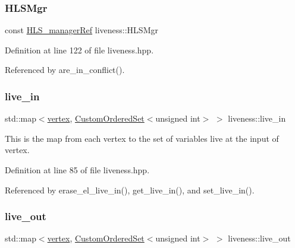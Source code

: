 \subsubsection{\texorpdfstring{H\+L\+S\+Mgr}{HLSMgr}}
{\footnotesize\ttfamily const \hyperlink{hls__manager_8hpp_acd3842b8589fe52c08fc0b2fcc813bfe}{H\+L\+S\+\_\+manager\+Ref} liveness\+::\+H\+L\+S\+Mgr\hspace{0.3cm}{\ttfamily [private]}}



Definition at line 122 of file liveness.\+hpp.



Referenced by are\+\_\+in\+\_\+conflict().

\mbox{\label{classliveness_a75ba4b82410bc9747fcdb44f6b313f00}} 
\subsubsection{\texorpdfstring{live\+\_\+in}{live\_in}}
{\footnotesize\ttfamily std\+::map$<$\hyperlink{graph_8hpp_abefdcf0544e601805af44eca032cca14}{vertex}, \hyperlink{classCustomOrderedSet}{Custom\+Ordered\+Set}$<$unsigned int$>$ $>$ liveness\+::live\+\_\+in\hspace{0.3cm}{\ttfamily [private]}}



This is the map from each vertex to the set of variables live at the input of vertex. 



Definition at line 85 of file liveness.\+hpp.



Referenced by erase\+\_\+el\+\_\+live\+\_\+in(), get\+\_\+live\+\_\+in(), and set\+\_\+live\+\_\+in().

\mbox{\label{classliveness_adbc38597d5850581947517fbf25d6354}} 
\subsubsection{\texorpdfstring{live\+\_\+out}{live\_out}}
{\footnotesize\ttfamily std\+::map$<$\hyperlink{graph_8hpp_abefdcf0544e601805af44eca032cca14}{vertex}, \hyperlink{classCustomOrderedSet}{Custom\+Ordered\+Set}$<$unsigned int$>$ $>$ liveness\+::live\+\_\+out\hspace{0.3cm}{\ttfamily [private]}}



